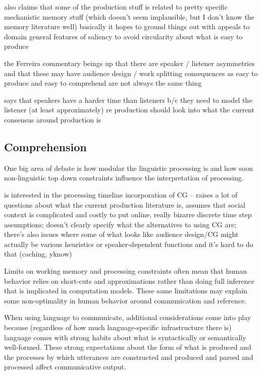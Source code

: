 \documentclass[]{article}
\begin{document}
\cite{macdonald2013} also claims that some of the production stuff is related to pretty specific mechanistic memory stuff (which doesn't seem implausible, but I don't know the memory literature well) basically it hopes to ground things out with appeals to domain general features of saliency to avoid circularity about what is easy to produce 

\cite{pickering2004} the Ferreira commentary beings up that there are speaker / listener asymmetries and that these may have audience design / work splitting consequences as easy to produce and easy to comprehend are not always the same thing 


\cite{heller2012} says that speakers have a harder time than listeners b/c they need to model the listener (at least approximately) 
re production should look into what the current consensus around production is 




\subsection{Comprehension}

One big area of debate is how modular the linguistic processing is and how soon non-linguistic top down constraints influence the interpretation of processing. 



\cite{horton1996} is interested in the processing timeline incorporation of CG -- raises a lot of questions about what the current production literature is, assumes that social context is complicated and costly to put online, really bizarre discrete time step assumptions; doesn't clearly specify what the alternatives to using CG are; there's also issues where some of what looks like audience design/CG might actually be various heuristics or speaker-dependent functions and it's hard to do that (caching, yknow) 

Limits on working memory and processing constraints often mean that human behavior relies on short-cuts and approximations rather than doing full inference that is implicated in computation models. These same limitations may explain some non-optimality in human behavior around communication and reference. 

When using language to communicate, additional considerations come into play because (regardless of how much language-specific infrastructure there is) language comes with strong habits about what is syntactically or semantically well-formed. These strong expectations about the form of what is produced and the processes by which utterances are constructed and produced and parsed and processed affect communicative output. 
\end{document}

